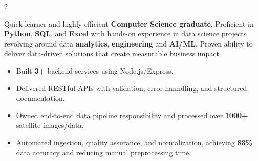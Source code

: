 \documentclass[10pt,a4paper,withhyper,normalphoto]{altacv}
\begin{document}


\makecvheader


\begin{paracol}{2}


\justifying
Quick learner and highly efficient \textbf{Computer Science graduate}. Proficient in \textbf{Python}, \textbf{SQL}, and \textbf{Excel} with hands-on experience in data science projects revolving around data \textbf{analytics}, \textbf{engineering} and \textbf{AI/ML}. Proven ability to deliver data-driven solutions that create measurable business impact


\begin{itemize}
\item Built \textbf{3+} backend services using Node.js/Express. 
\item Delivered RESTful APIs with validation, error hanndling, and structured documentation.
\end{itemize}

\divider

\begin{itemize}
\item Owned end-to-end data pipeline responsibility and processed over \textbf{1000+} satellite images/data.
\item Automated ingestion, quality assurance, and normalization, achieving \textbf{83\%} data accuracy and reducing manual preprocessing time.
\end{itemize}

\divider


\end{paracol}
\end{document}
